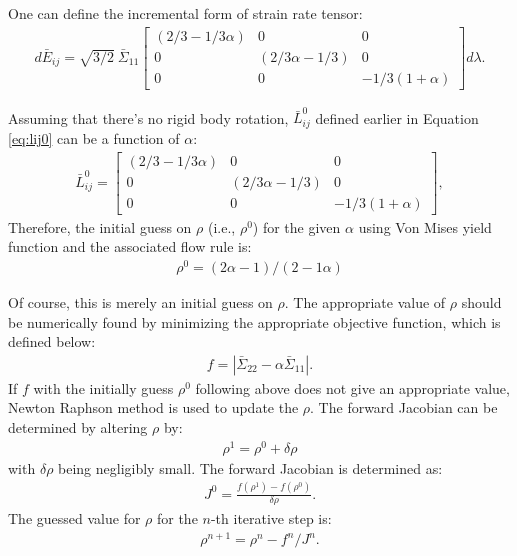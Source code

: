 \documentclass[12pt]{amsart}
\begin{document}
One can define the incremental form of strain rate tensor:
\begin{eqnarray}
  d\bar{E}_{ij} = \sqrt{3/2}\  \bar{\Sigma}_{11}
\begin{bmatrix}
  (2/3-1/3\alpha) &0                       &0\\
  0                                &(2/3\alpha - 1/3)&0\\
  0                 &0                       &-1/3(1+\alpha)
\end{bmatrix}
d\lambda.
\end{eqnarray}

Assuming that there's no rigid body rotation, $\bar{L}_{ij}^0$ defined earlier in Equation \ref{eq:lij0} can be a function of
$\alpha$:
\begin{eqnarray}
  \label{eq:lij0_alpha}
  \bar{L}^0_{ij} =
  \begin{bmatrix}
  (2/3-1/3\alpha) &0                       &0\\
  0                                &(2/3\alpha - 1/3)&0\\
  0                 &0                       &-1/3(1+\alpha)
  \end{bmatrix},
\end{eqnarray}
Therefore, the initial guess on $\rho$ (i.e., $\rho^0$) for the given $\alpha$ using Von Mises yield function and the associated flow rule is:
\begin{eqnarray}
  \label{eq:rho_alpha}
\rho^0 = (2 \alpha - 1) / (2 - 1 \alpha)
\end{eqnarray}

Of course, this is merely an initial guess on $\rho$.
The appropriate value of $\rho$ should be numerically found by minimizing the appropriate objective function, which is defined below:
\begin{eqnarray}
  \label{eq:f_obj_alpha}
  f = |\bar{\Sigma}_{22} - \alpha \bar{\Sigma}_{11}|.
\end{eqnarray}
If $f$ with the initially guess $\rho^0$ following above does not give an appropriate value, Newton Raphson method is used to update the $\rho$.
The forward Jacobian can be determined by altering $\rho$ by:
\begin{eqnarray}
  \label{eq:rho_var}
  \rho^1 = \rho^0 + \delta\rho
\end{eqnarray}
with $\delta\rho$ being negligibly small.
The forward Jacobian is determined as:
\begin{eqnarray}
  \label{eq:jacob_alpha}
  J^0 = \frac{f(\rho^1) - f(\rho^0)}{\delta\rho}.
\end{eqnarray}
The guessed value for $\rho$ for the $n$-th iterative step is:
\begin{eqnarray}
  \label{eq:update_rho}
  \rho^{n+1} = \rho^n - f^n/J^n.
\end{eqnarray}
\end{document}
